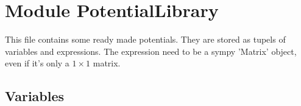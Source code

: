 
\section{Module PotentialLibrary}

    \label{PotentialLibrary}
This file contains some ready made potentials. They are stored as tupels of
variables and expressions. The expression need to be a sympy 'Matrix'
object, even if it's only a $1 \times 1$ matrix.


  \subsection{Variables}

